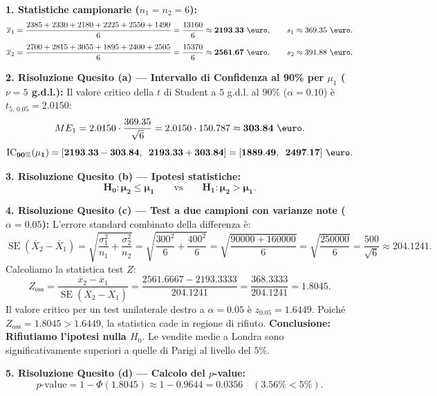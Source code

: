 \documentclass[11pt,a4paper]{article}
\begin{document}
\begin{soluzionebox}
\textbf{1. Statistiche campionarie ($n_1 = n_2 = 6$):}
\[
\overline{x}_1 = \frac{2385 + 2330 + 2180 + 2225 + 2550 + 1490}{6} = \frac{13160}{6} \approx \mathbf{2193.33\text{ \euro}}, \qquad s_1 \approx 369.35\text{ \euro}.
\]
\[
\overline{x}_2 = \frac{2700 + 2815 + 3055 + 1895 + 2400 + 2505}{6} = \frac{15370}{6} \approx \mathbf{2561.67\text{ \euro}}, \qquad s_2 \approx 391.88\text{ \euro}.
\]

\textbf{2. Risoluzione Quesito (a) --- Intervallo di Confidenza al 90\% per $\mu_1$ ($\nu = 5$ g.d.l.):}
Il valore critico della $t$ di Student a $5$ g.d.l. al $90\%$ ($\alpha = 0.10$) è $t_{5, \, 0.05} = 2.0150$:
\[
ME_1 = 2.0150 \cdot \frac{369.35}{\sqrt{6}} = 2.0150 \cdot 150.787 \approx \mathbf{303.84\text{ \euro}}.
\]
\[
\mathbf{\operatorname{IC}_{90\%}(\mu_1) = [2193.33 - 303.84, \;\; 2193.33 + 303.84] = [1889.49, \;\; 2497.17]\text{ \euro}}.
\]

\textbf{3. Risoluzione Quesito (b) --- Ipotesi statistiche:}
\[
\mathbf{H_0: \mu_2 \le \mu_1} \qquad \text{vs} \qquad \mathbf{H_1: \mu_2 > \mu_1}.
\]

\textbf{4. Risoluzione Quesito (c) --- Test a due campioni con varianze note ($\alpha = 0.05$):}
L'errore standard combinato della differenza è:
\[
\operatorname{SE}(\overline{X}_2 - \overline{X}_1) = \sqrt{\frac{\sigma_1^2}{n_1} + \frac{\sigma_2^2}{n_2}} = \sqrt{\frac{300^2}{6} + \frac{400^2}{6}} = \sqrt{\frac{90000 + 160000}{6}} = \sqrt{\frac{250000}{6}} = \frac{500}{\sqrt{6}} \approx 204.1241.
\]
Calcoliamo la statistica test $Z$:
\[
Z_{\text{oss}} = \frac{\overline{x}_2 - \overline{x}_1}{\operatorname{SE}(\overline{X}_2 - \overline{X}_1)} = \frac{2561.6667 - 2193.3333}{204.1241} = \frac{368.3333}{204.1241} = \mathbf{1.8045}.
\]
Il valore critico per un test unilaterale destro a $\alpha = 0.05$ è $z_{0.05} = 1.6449$.
Poiché $Z_{\text{oss}} = 1.8045 > 1.6449$, la statistica cade in regione di rifiuto.
\textbf{Conclusione:} \textbf{Rifiutiamo l'ipotesi nulla $H_0$}. Le vendite medie a Londra sono significativamente superiori a quelle di Parigi al livello del $5\%$.

\textbf{5. Risoluzione Quesito (d) --- Calcolo del $p$-value:}
\[
p\text{-value} = 1 - \Phi(1.8045) \approx 1 - 0.9644 = \mathbf{0.0356} \quad (\mathbf{3.56\%} < 5\%).
\]
\end{soluzionebox}
\end{document}
